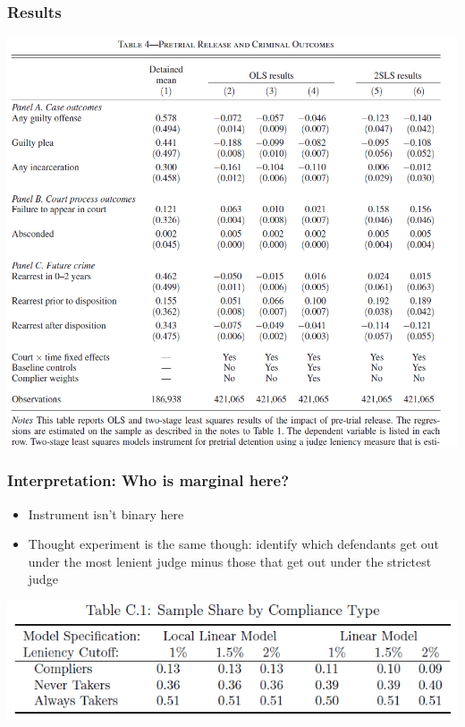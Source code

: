 \begin{frame}
  \frametitle{Results}
  \begin{center}
    \includegraphics[height=.8\textheight]{./resources/DobbieResults}
  \end{center}  
\end{frame}

\begin{frame}
  \frametitle{Interpretation: Who is marginal here?}
  \pause 
  \begin{itemize}
    \item Instrument isn't binary here
    \item Thought experiment is the same though: identify which defendants get out under the most lenient judge minus those that get out under the strictest judge 
   \end{itemize}
   \includegraphics[width=.9\textwidth]{./resources/DobbieCompliers} 
\end{frame}

